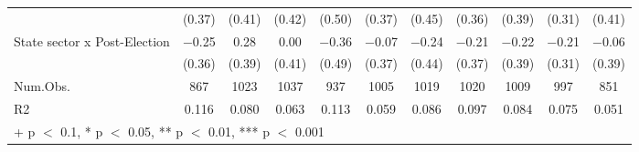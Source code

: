 \documentclass[
  letterpaper,
  DIV=11,
  numbers=noendperiod]{scrartcl}
\begin{document}
\begin{table}[!h]
{\begin{tabular}[t]{lcccccccccc}
 & (\num{0.37}) & (\num{0.41}) & (\num{0.42}) & (\num{0.50}) & (\num{0.37}) & (\num{0.45}) & (\num{0.36}) & (\num{0.39}) & (\num{0.31}) & (\num{0.41})\\
State sector x Post-Election & \num{-0.25} & \num{0.28} & \num{0.00} & \num{-0.36} & \num{-0.07} & \num{-0.24} & \num{-0.21} & \num{-0.22} & \num{-0.21} & \num{-0.06}\\
 & (\num{0.36}) & (\num{0.39}) & (\num{0.41}) & (\num{0.49}) & (\num{0.37}) & (\num{0.44}) & (\num{0.37}) & (\num{0.39}) & (\num{0.31}) & (\num{0.39})\\
\midrule
Num.Obs. & \num{867} & \num{1023} & \num{1037} & \num{937} & \num{1005} & \num{1019} & \num{1020} & \num{1009} & \num{997} & \num{851}\\
R2 & \num{0.116} & \num{0.080} & \num{0.063} & \num{0.113} & \num{0.059} & \num{0.086} & \num{0.097} & \num{0.084} & \num{0.075} & \num{0.051}\\
\bottomrule
\multicolumn{11}{l}{\rule{0pt}{1em}+ p $<$ 0.1, * p $<$ 0.05, ** p $<$ 0.01, *** p $<$ 0.001}\\
\end{tabular}}
\end{table}
\end{document}
